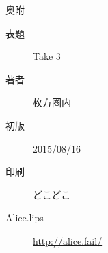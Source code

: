 
\vspace*{150mm}

\begin{flushright}
\begin{minipage}{70mm}
\begin{itembox}{ 奥附 }
  \begin{description}
    \item[表題] Take 3
    \item[著者] 枚方圏内
    \item[初版] 2015/08/16
    \item[印刷] どこどこ
    \item[Alice.lips] \url{http://alice.fail/}
  \end{description}
\end{itembox}
\end{minipage}
\end{flushright}
